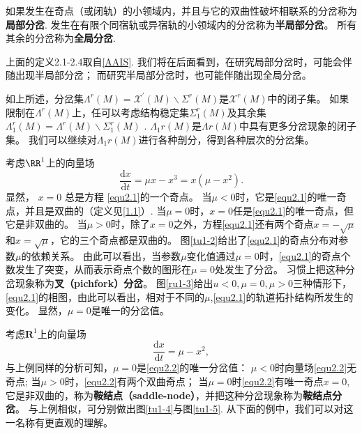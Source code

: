 \begin{defination}
  如果发生在奇点（或闭轨）的小领域内，并且与它的双曲性破坏相联系的分岔称为\textbf{局部分岔}.
  发生在有限个同宿轨或异宿轨的小领域内的分岔称为\textbf{半局部分岔}。
所有其余的分岔称为\textbf{全局分岔}.
\end{defination}
上面的定义2.1-2.4取自\ref{AAIS}.
我们将在后面看到，在研究局部分岔时，可能会伴随出现半局部分岔；
而研究半局部分岔时，也可能伴随出现全局分岔。
\begin{corollary}
  如上所述，分岔集$\Lambda^ { r } ( M ) = \mathscr { X} ^ { \prime } ( M ) \backslash \Sigma ^ { r } ( M )$是$\mathscr { X} ^ { r } ( M )$中的闭子集。
  如果限制在$\Lambda^ { r } ( M )$上，任可以考虑结构稳定集$\Sigma _ { 1 } ^r ( M )$及其余集$\Lambda _ { 1 } ^ { r } ( M ) = \Lambda^ { r } ( M )\backslash  \Sigma _ { 1 } ^ { r } ( M )$ .
  $ \Lambda _ { 1 } r ( M )$是$ \Lambda  r ( M )$中具有更多分岔现象的闭子集。
  我们可以继续对$ \Lambda _ { 1 } r ( M )$进行各种剖分，得到各种层次的分岔集。
\end{corollary}

\begin{example}
  考虑$\RR^{1}$上的向量场
  \begin{equation}
    \frac { \mathrm { d } x } { \mathrm { d } t } = \mu x - x ^ { 3 } = x \left( \mu - x ^ { 2 } \right).
    \label{equ2.1}
\end{equation}
显然，
$ x=0 $
总是方程 \ref{equ2.1}的一个奇点。
当$\mu < 0$时，它是\ref{equ2.1}的唯一奇点，并且是双曲的（定义见\ref{1.1}）.
当\(\mu=0\)时，\(x=0\)任是\ref{equ2.1}的唯一奇点，但它是非双曲的。
当\(\mu>0\)时，除了\(x=0\)之外，方程\ref{equ2.1}还有两个奇点$x = - \sqrt { \mu } $和$ x = \sqrt { \mu }$，它的三个奇点都是双曲的。
图\ref{tu1-2}给出了\ref{equ2.1}的奇点分布对参数\(\mu\)的依赖关系。
由此可以看出，当参数\(\mu\)变化值通过\(\mu=0\)时，\ref{equ2.1}的奇点个数发生了突变，从而表示奇点个数的图形在\(\mu=0\)处发生了分岔。
习惯上把这种分岔现象称为\textbf{叉（pichfork）分岔}。
图\ref{ru1-3}给出$u < 0 , \mu= 0 , \mu > 0$三种情形下，\ref{equ2.1}的相图，由此可以看出，相对于不同的\(\mu\),\ref{equ2.1}的轨道拓扑结构所发生的变化。
显然，\(\mu=0\)是唯一的分岔值。
\end{example}

\begin{example}
  考虑$\mathbf { R } ^ { 1 }$上的向量场
  \begin{equation}
    \frac { \mathrm { d } x } { \mathrm { d } t } = \mu - x ^ { 2 },
    \label{equ2.2}
  \end{equation}
  与上例同样的分析可知，$\mu = 0$是\ref{equ2.2}的唯一分岔值：
  \(\mu<0\)时向量场\ref{equ2.2}无奇点;
  当\(\mu>0\)时，\ref{equ2.2}有两个双曲奇点；
  当\(\mu=0\)时\ref{equ2.2}有唯一奇点\(x=0\),它是非双曲的，称为\textbf{鞍结点（saddle-node）}，并把这种分岔现象称为\textbf{鞍结点分岔}。
  与上例相似，可分别做出图\ref{tu1-4}与图\ref{tu1-5}.
  从下面的例中，我们可以对这一名称有更直观的理解。
\end{example}

